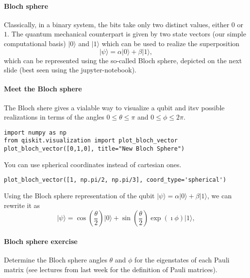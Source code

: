 \paragraph{Bloch sphere}

Classically, in a binary system, the bits take only two distinct
values, either $0$ or $1$.  The quantum mechanical counterpart is
given by two state vectors (our simple computational basis)
$\vert 0 \rangle$ and $\vert 1\rangle $ which can be used to realize the
superposition
\[
\vert \psi \rangle = \alpha \vert 0 \rangle +\beta\vert 1\rangle, 
\]
which can be represented using the so-called Bloch sphere, depicted on the next slide (best seen using the jupyter-notebook).


\paragraph{Meet the Bloch sphere}
The Bloch shere gives a vialable way to visualize a qubit and itsv possible realizations in terms of the angles $0\le \theta \le \pi$ and
$0\le \phi \le 2\pi$. 




\begin{Verbatim}[numbers=none,fontsize=\fontsize{9pt}{9pt},baselinestretch=0.95]
import numpy as np
from qiskit.visualization import plot_bloch_vector
plot_bloch_vector([0,1,0], title="New Bloch Sphere")

\end{Verbatim}

You can use spherical coordinates instead of cartesian ones.


\begin{Verbatim}[numbers=none,fontsize=\fontsize{9pt}{9pt},baselinestretch=0.95]
plot_bloch_vector([1, np.pi/2, np.pi/3], coord_type='spherical')

\end{Verbatim}

Using the Bloch sphere representation of the qubit $\vert \psi \rangle = \alpha \vert 0 \rangle +\beta\vert 1\rangle$, we can rewrite it as
\[
\vert \psi \rangle = \cos{(\frac{\theta}{2})} \vert 0 \rangle +\sin{(\frac{\theta}{2})}\exp{(\imath\phi)}\vert 1\rangle, 
\]


\paragraph{Bloch sphere exercise}

Determine the Bloch sphere angles $\theta$ and $\phi$ for the eigenstates of each Pauli matrix (see lectures from last week for the definition of Pauli matrices).


